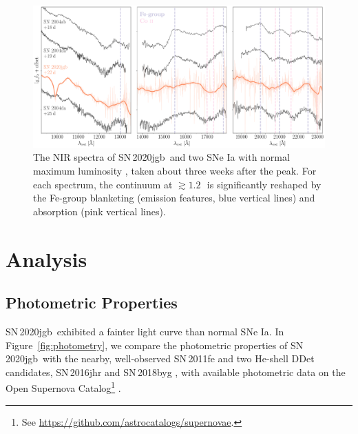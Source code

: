 \documentclass[twocolumn]{aastex631}
\newcommand{\sn}{SN\,2020jgb}
\begin{document}
\begin{figure}
    \centering
    \includegraphics[width=\textwidth]{NIR_spec.pdf}
    \caption{The NIR spectra of \sn\ and two SNe Ia with normal maximum luminosity \citep[SN\,2004ab and SN\,2004da,][]{Marion2009_NIR}, taken about three weeks after the peak. For each spectrum, the continuum at $\gtrsim1.2$\,\micron\ is significantly reshaped by the Fe-group blanketing (emission features, blue vertical lines) and  absorption (pink vertical lines).}
    \label{fig:NIR_spec}
\end{figure}

\section{Analysis} \label{sec:analysis}
\subsection{Photometric Properties}
\sn\ exhibited a fainter light curve than normal SNe Ia. In Figure~\ref{fig:photometry}, we compare the photometric properties of \sn\ with the nearby, well-observed SN\,2011fe \citep{Nugent_11fe_2011} and two He-shell DDet candidates, SN\,2016jhr \citep{jiang_16jhr_2017} and SN\,2018byg \citep{de_18byg_2019}, with available photometric data on the Open Supernova Catalog\footnote{See \url{https://github.com/astrocatalogs/supernovae}.} \citep{Guillochon_2017}.
\end{document}
